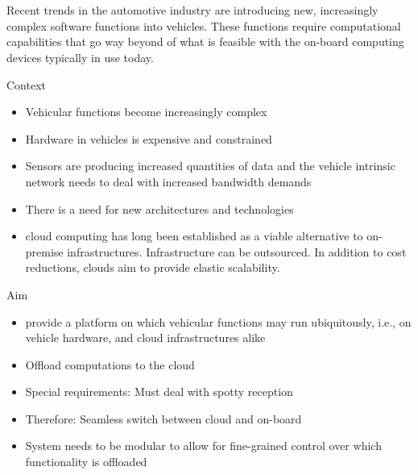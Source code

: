 \chapter{\abstractname}

Recent trends in the automotive industry are introducing new, increasingly complex software functions into vehicles. These functions require computational capabilities that go way beyond of what is feasible with the on-board computing devices typically in use today.

Context
\begin{itemize}
\item Vehicular functions become increasingly complex
\item Hardware in vehicles is expensive and constrained
\item Sensors are producing increased quantities of data and the vehicle intrinsic network needs to deal with increased bandwidth demands
\item There is a need for new architectures and technologies
\item cloud computing has long been established as a viable alternative to on-premise infrastructures. Infrastructure can be outsourced. In addition to cost reductions, clouds aim to provide elastic scalability.
\end{itemize}

Aim
\begin{itemize}
\item provide a platform on which vehicular functions may run ubiquitously, i.e., on vehicle hardware, and cloud infrastructures alike
\item Offload computations to the cloud
\item Special requirements: Must deal with spotty reception
\item Therefore: Seamless switch between cloud and on-board
\item System needs to be modular to allow for fine-grained control over which functionality is offloaded
\end{itemize}

